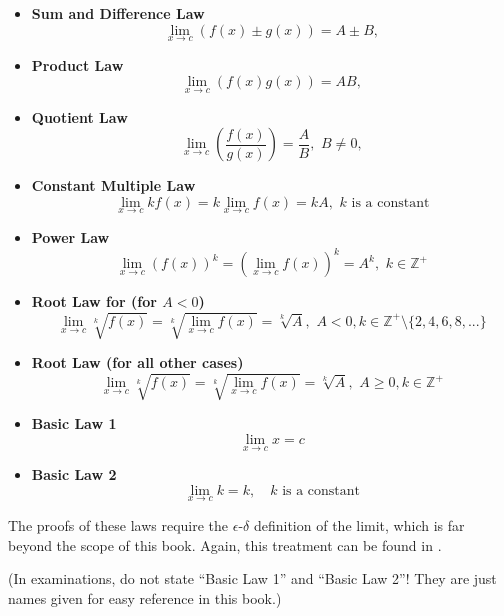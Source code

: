 \begin{itemize}
    \item \textbf{Sum and Difference Law}
    \[
    \lim_{x \to c} (f(x) \pm g(x)) = A \pm B,
    \]
    \item \textbf{Product Law}
    \[
    \lim_{x \to c} (f(x) g(x)) = A B,
    \]
    \item \textbf{Quotient Law}
    \[
    \lim_{x \to c} \left(\frac{f(x)}{g(x)}\right)  = \frac{A}{B},\,\,B\ne 0,
    \]
    \item \textbf{Constant Multiple Law}
    \[
    \lim_{x \to c} kf(x) = k\lim_{x \to c} f(x) = kA,\,\,k\,\,\text{is a constant}
    \]
    \item \textbf{Power Law}
    \[
    \lim_{x \to c} (f(x))^k = (\lim_{x \to c} f(x))^k = A^k,\,\,k \in \mathbb{Z^+}
    \]
    \item \textbf{Root Law for (for $A < 0$)}
    \[
    \lim_{x \to c} \sqrt[k]{f(x)} = \sqrt[k]{\lim_{x \to c} f(x)} = \sqrt[k]{A},\,\,A < 0, k \in \mathbb{Z^+}
    \setminus \{2, 4, 6, 8, ...\}
    \]
    \item \textbf{Root Law (for all other cases)}
    \[
    \lim_{x \to c} \sqrt[k]{f(x)} = \sqrt[k]{\lim_{x \to c} f(x)} = \sqrt[k]{A},\,\,A \ge 0, k \in \mathbb{Z^+}
    \]
    \item \textbf{Basic Law 1}
    \[
    \lim_{x \to c} x = c
    \]
    \item \textbf{Basic Law 2}
    \[
    \lim_{x \to c} k = k, \quad \text{$k$ is a constant}
    \]
\end{itemize}

The proofs of these laws require the $\epsilon$-$\delta$ definition of the limit, which is far beyond
the scope of this book. Again, this treatment can be found in \cite{Gong_2017}.

(In examinations, do not state ``Basic Law 1'' and ``Basic Law 2''! They are just names given for
easy reference in this book.)

